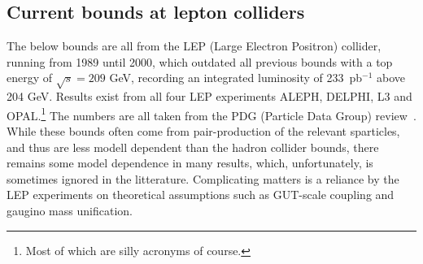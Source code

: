 \documentclass[notes.tex]{subfiles}
\begin{document}
\subsection{Current bounds at lepton colliders}
The below bounds are all from the LEP (Large Electron Positron) collider, running from 1989 until 2000, which outdated all previous bounds with a top energy of $\sqrt{s}=209$ GeV, recording an integrated luminosity of 233~pb$^{-1}$ above 204 GeV. Results exist from all four LEP experiments ALEPH, DELPHI, L3 and OPAL.\footnote{Most of which are silly acronyms of course.} The numbers are all taken from the PDG (Particle Data Group) review~\cite{Agashe:2014kda}. While these bounds often come from pair-production of the relevant sparticles, and thus are less modell dependent than the hadron collider bounds, there remains some model dependence in many results, which, unfortunately, is sometimes ignored in the litterature. Complicating matters is a reliance by the LEP experiments on theoretical assumptions such as GUT-scale coupling and gaugino mass unification.
\end{document}
